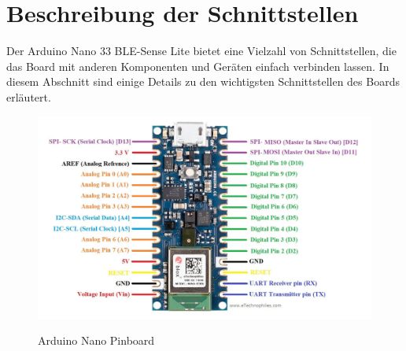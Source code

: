 \section{Beschreibung der Schnittstellen}
Der Arduino Nano 33 BLE-Sense Lite bietet eine Vielzahl von Schnittstellen, die das Board mit anderen Komponenten und Geräten einfach verbinden lassen. In diesem Abschnitt sind einige Details zu den wichtigsten Schnittstellen des Boards erläutert.
\begin{figure}[htb]
	\includegraphics[width=14cm]{General/ArduinoPinBoard.png}
	\caption{Arduino Nano Pinboard} \label{Arduino Nano Pinbout}\begin{center}
		\cite{Arduino2023} %
	\end{center}
\end{figure}

